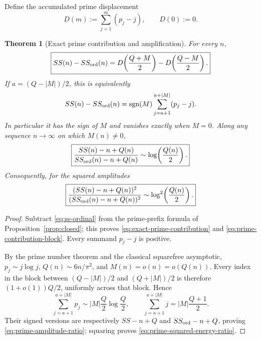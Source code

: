 \documentclass[11pt]{amsart}
\numberwithin{equation}{section}
\theoremstyle{plain}
\newtheorem{theorem}{Theorem}[section]
\theoremstyle{definition}
\theoremstyle{remark}
\begin{document}
Define the accumulated prime displacement
\begin{equation}
\label{eq:D-prime-displacement}
D(m):=\sum_{j=1}^{m}(p_j-j),\qquad D(0):=0.
\end{equation}

\begin{theorem}[Exact prime contribution and amplification]
\label{thm:prime-ordinal-amplification}
For every $n$,
\begin{equation}
\label{eq:exact-prime-contribution}
\boxed{
SS(n)-SS_{\rm ord}(n)
=D\!\left(\frac{Q+M}{2}\right)
-D\!\left(\frac{Q-M}{2}\right).}
\end{equation}
If $a=(Q-|M|)/2$, this is equivalently
\begin{equation}
\label{eq:prime-contribution-block}
SS(n)-SS_{\rm ord}(n)
=\operatorname{sgn}(M)
\sum_{j=a+1}^{a+|M|}(p_j-j).
\end{equation}
In particular it has the sign of $M$ and vanishes exactly when $M=0$.
Along any sequence $n\to\infty$ on which $M(n)\ne0$,
\begin{equation}
\label{eq:prime-amplitude-ratio}
\boxed{
\frac{SS(n)-n+Q(n)}{SS_{\rm ord}(n)-n+Q(n)}
\sim\log\!\left(\frac{Q(n)}2\right).}
\end{equation}
Consequently, for the squared amplitudes
\begin{equation}
\label{eq:prime-squared-energy-ratio}
\boxed{
\frac{(SS(n)-n+Q(n))^2}
{(SS_{\rm ord}(n)-n+Q(n))^2}
\sim\log^2\!\left(\frac{Q(n)}2\right).}
\end{equation}
\end{theorem}

\begin{proof}
Subtract \eqref{eq:ss-ordinal} from the prime-prefix formula of
Proposition~\ref{prop:closed}; this proves
\eqref{eq:exact-prime-contribution} and \eqref{eq:prime-contribution-block}.
Every summand $p_j-j$ is positive.

By the prime number theorem and the classical squarefree asymptotic,
$p_j\sim j\log j$, $Q(n)\sim6n/\pi^2$, and $M(n)=o(n)=o(Q(n))$.  Every index
in the block between $(Q-|M|)/2$ and $(Q+|M|)/2$ is therefore
$(1+o(1))Q/2$, uniformly across that block.  Hence
\begin{equation*}
\sum_{j=a+1}^{a+|M|}p_j
\sim |M|\frac Q2\log\frac Q2,
\qquad
\sum_{j=a+1}^{a+|M|}j
=|M|\frac{Q+1}{2}.
\end{equation*}
Their signed versions are respectively $SS-n+Q$ and
$SS_{\rm ord}-n+Q$, proving \eqref{eq:prime-amplitude-ratio}; squaring proves
\eqref{eq:prime-squared-energy-ratio}.
\end{proof}
\end{document}
